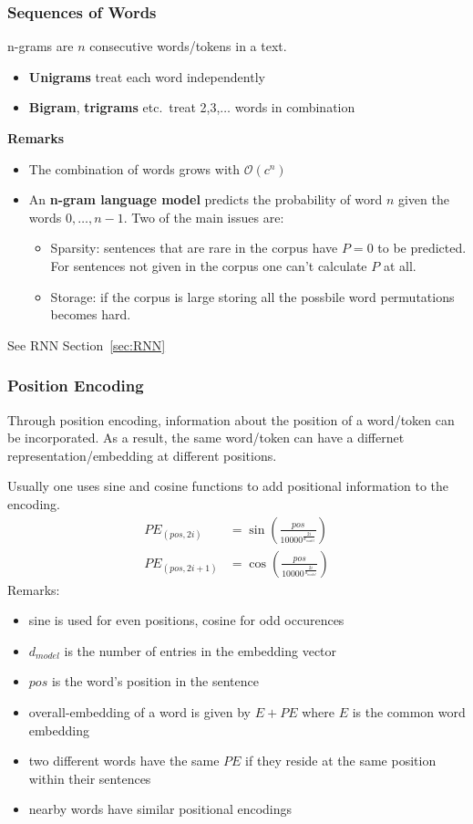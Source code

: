 \subsubsection{Sequences of Words}
n-grams are $n$ consecutive words/tokens in a text.
\begin{itemize}
    \item \textbf{Unigrams} treat each word independently
    \item \textbf{Bigram}, \textbf{trigrams} etc.\ treat 2,3,$\ldots$ words in combination
\end{itemize}
\textbf{Remarks}
\begin{itemize}
    \item The combination of words grows with $\mathcal{O}(c^n)$
    \item An \textbf{n-gram language model} predicts the probability of word $n$ given the words $0,\dots,n-1$. Two of the main issues are:
          \begin{itemize}
              \item Sparsity: sentences that are rare in the corpus have $P=0$ to be predicted. For sentences not given in the corpus one can't calculate $P$ at all.
              \item Storage: if the corpus is large storing all the possbile word permutations becomes hard.
          \end{itemize}
\end{itemize}

\newpar{}
See RNN Section~\ref{sec:RNN}

\subsubsection{Position Encoding}
Through position encoding, information about the position of a word/token can be incorporated. As a result, the same word/token can have a differnet representation/embedding at different positions.
\newpar{}

Usually one uses sine and cosine functions to add positional information to the encoding.
\begin{align*}
    PE_{(pos,2i)}   & =\sin\left(\frac{pos}{10000^{\frac{2i}{d_{model}}}}\right) \\
    PE_{(pos,2i+1)} & =\cos\left(\frac{pos}{10000^{\frac{2i}{d_{model}}}}\right)
\end{align*}
Remarks:
\begin{itemize}
    \item sine is used for even positions, cosine for odd occurences
    \item $d_{model}$ is the number of entries in the embedding vector
    \item $pos$ is the word's position in the sentence
    \item overall-embedding of a word is given by $E+PE$ where $E$ is the common word embedding
    \item two different words have the same $PE$ if they reside at the same position within their sentences
    \item nearby words have similar positional encodings
\end{itemize}

